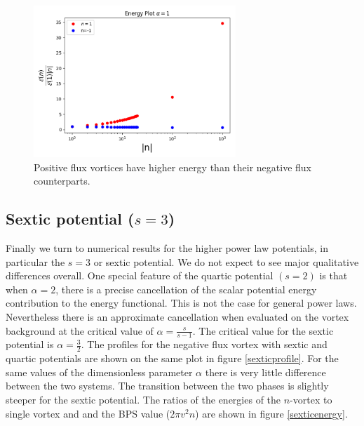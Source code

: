 \begin{figure}[H]
\begin{center}
 \includegraphics[width=3in]{Chapter_2_Folder_1912.11321/figures/positive_n_energy.pdf}
     \caption[\textcolor{red}{Energy per flux for positive winding number $n$.}]{{\small Positive flux vortices have higher energy than their negative flux counterparts.}} \label{positiveenergy}
    \end{center}
\end{figure}
\subsection{Sextic potential ($s=3$)}
Finally we turn to numerical results for the higher power law potentials, in particular the $s=3$
or sextic potential. We do not expect to see major qualitative differences overall. One special feature of the quartic potential $(s=2)$ is that when $\alpha=2$, there is a precise cancellation of the scalar potential energy contribution to the energy functional. This is not the case for general power laws. Nevertheless there is an approximate cancellation when evaluated on the vortex background at the critical value of $\alpha = \frac{s}{s-1}$.   The critical value for the sextic potential is $\alpha = \frac32$.
The profiles for the negative flux vortex with sextic and quartic potentials are shown on the same plot in figure \ref{sexticprofile}. For the same values of the dimensionless parameter $\alpha$ there is very little difference between the two systems. The transition between the two phases is slightly steeper for the sextic potential. The ratios of the energies of the $n$-vortex to single vortex and and the BPS value ($2\pi v^2 n$) are shown in figure 
\ref{sexticenergy}.

